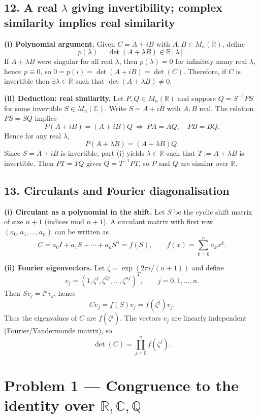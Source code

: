 \documentclass[12pt,a4paper]{article}
\theoremstyle{plain}
\theoremstyle{definition}      %
\begin{document}
\subsection*{12. A real $\lambda$ giving invertibility; complex similarity implies real similarity}

\textbf{(i) Polynomial argument.}
Given $C=A+iB$ with $A,B\in M_n(\mathbb R)$, define
\[
p(\lambda)=\det(A+\lambda B)\in \mathbb R[\lambda].
\]
If $A+\lambda B$ were singular for all real $\lambda$, then $p(\lambda)=0$ for infinitely many real $\lambda$,
hence $p\equiv 0$, so $0=p(i)=\det(A+iB)=\det(C)$.
Therefore, if $C$ is invertible then $\exists \lambda\in\mathbb R$ such that $\det(A+\lambda B)\neq 0$.

\textbf{(ii) Deduction: real similarity.}
Let $P,Q\in M_n(\mathbb R)$ and suppose $Q=S^{-1}PS$ for some invertible $S\in M_n(\mathbb C)$.
Write $S=A+iB$ with $A,B$ real. The relation $PS=SQ$ implies
\[
P(A+iB)=(A+iB)Q \ \Rightarrow\ PA=AQ,\quad PB=BQ.
\]
Hence for any real $\lambda$,
\[
P(A+\lambda B)=(A+\lambda B)Q.
\]
Since $S=A+iB$ is invertible, part (i) yields $\lambda\in\mathbb R$ such that $T:=A+\lambda B$ is invertible.
Then $PT=TQ$ gives $Q=T^{-1}PT$, so $P$ and $Q$ are similar over $\mathbb R$.

\subsection*{13. Circulants and Fourier diagonalisation}

\textbf{(i) Circulant as a polynomial in the shift.}
Let $S$ be the cyclic shift matrix of size $n+1$ (indices mod $n+1$). A circulant matrix with first row
$(a_0,a_1,\dots,a_n)$ can be written as
\[
C=a_0 I+a_1 S+\cdots+a_n S^n = f(S),
\qquad f(x)=\sum_{k=0}^n a_k x^k.
\]

\textbf{(ii) Fourier eigenvectors.}
Let $\zeta=\exp(2\pi i/(n+1))$ and define
\[
v_j=(1,\zeta^j,\zeta^{2j},\dots,\zeta^{nj})^T,\qquad j=0,1,\dots,n.
\]
Then $Sv_j=\zeta^j v_j$, hence
\[
Cv_j=f(S)v_j=f(\zeta^j)v_j.
\]
Thus the eigenvalues of $C$ are $f(\zeta^j)$.
The vectors $v_j$ are linearly independent (Fourier/Vandermonde matrix), so
\[
\det(C)=\prod_{j=0}^{n} f(\zeta^j).
\]


\section{Problem 1 — Congruence to the identity over $\mathbb R,\mathbb C,\mathbb Q$}
\end{document}
